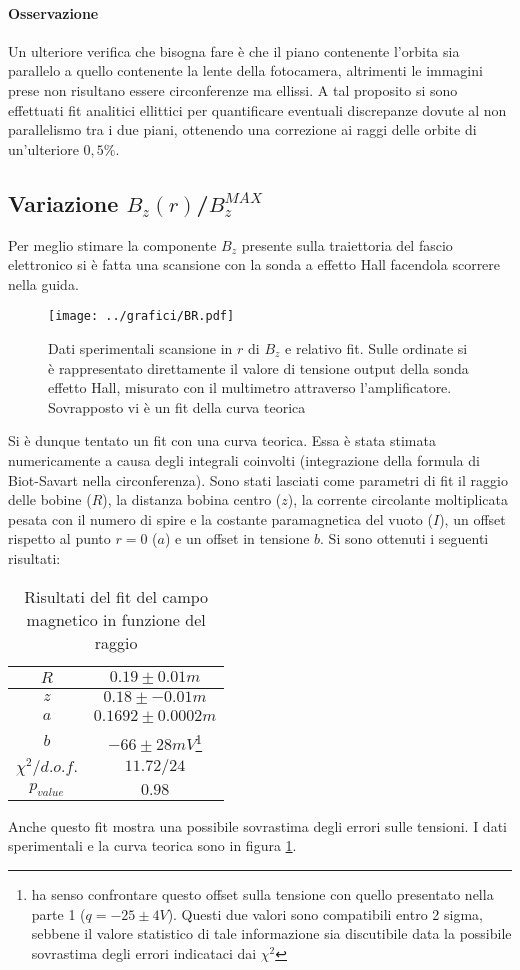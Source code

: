 \documentclass[10pt,a4paper]{article}
\begin{document}
\paragraph{Osservazione}
Un ulteriore verifica che bisogna fare è che il piano contenente l'orbita sia parallelo a quello contenente la lente della fotocamera, altrimenti le immagini prese non risultano essere circonferenze ma ellissi. A tal proposito si sono effettuati fit analitici ellittici per quantificare eventuali discrepanze dovute al non parallelismo tra i due piani, ottenendo una correzione ai raggi delle orbite di un'ulteriore $0,5\%$.

\subsection{Variazione $B_z(r)$/$B_z^{MAX}$}

Per meglio stimare la componente $B_z$ presente sulla traiettoria del fascio elettronico si è fatta una scansione con la sonda a effetto Hall facendola scorrere nella guida. 

\begin{figure}[h!]
	\centering
	\texttt{[image: ../grafici/BR.pdf]}
	\caption{Dati sperimentali scansione in $r$ di $B_z$ e relativo fit. Sulle ordinate si è rappresentato direttamente il valore di tensione output della sonda effetto Hall, misurato con il multimetro attraverso l'amplificatore. Sovrapposto vi è un fit della curva teorica}
	\label{BR}
\end{figure}

Si è dunque tentato un fit con una curva teorica. Essa è stata stimata numericamente a causa degli integrali coinvolti (integrazione della formula di Biot-Savart nella circonferenza). Sono stati lasciati come parametri di fit il raggio delle bobine ($R$), la distanza bobina centro ($z$), la corrente circolante moltiplicata pesata con il numero di spire e la costante paramagnetica del vuoto ($I$), un offset rispetto al punto $r=0$ ($a$) e un offset in tensione $b$. Si sono ottenuti i seguenti risultati:

\begin{table}[H]
	\centering
	\begin{tabular}{c|c}
		$R$ & $0.19\pm 0.01 m$\\
		\hline
		$z$ & $0.18\pm-0.01 m$ \\
		\hline
		$a$ & $0.1692 \pm 0.0002 m$\\ 
		\hline
		$b$ & $-66 \pm 28 mV$\footnote{ha senso confrontare questo offset sulla tensione con quello presentato nella parte 1 ($q=-25\pm 4 V$). Questi due valori sono compatibili entro 2 sigma, sebbene il valore statistico di tale informazione sia discutibile data la possibile sovrastima degli errori indicataci dai $\chi^2$}\\
		\hline
		$\chi^2/d.o.f.$ & $11.72 / 24$\\
		\hline
		$p_{value}$ & $0.98$\\
		\end{tabular}
	\caption{Risultati del fit del campo magnetico in funzione del raggio}
	\label{tab:BrBmax}
\end{table}

Anche questo fit mostra una possibile sovrastima degli errori sulle tensioni. I dati sperimentali e la curva teorica sono in figura \ref{BR}.
\end{document}
